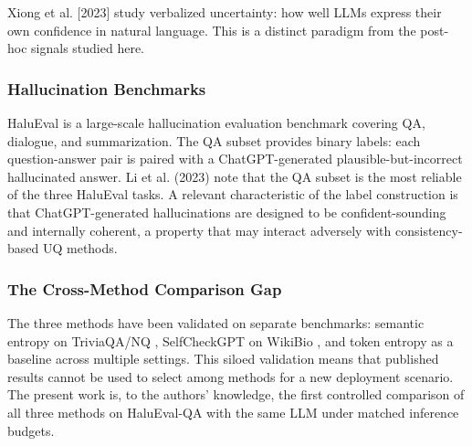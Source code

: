 Xiong et al. [2023] study verbalized uncertainty: how well LLMs express their own confidence in natural language. This is a distinct paradigm from the post-hoc signals studied here.

\subsubsection{Hallucination Benchmarks}

HaluEval \citep{Lietal2023} is a large-scale hallucination evaluation benchmark covering QA, dialogue, and summarization. The QA subset provides binary labels: each question-answer pair is paired with a ChatGPT-generated plausible-but-incorrect hallucinated answer. Li et al. (2023) note that the QA subset is the most reliable of the three HaluEval tasks. A relevant characteristic of the label construction is that ChatGPT-generated hallucinations are designed to be confident-sounding and internally coherent, a property that may interact adversely with consistency-based UQ methods.

\subsubsection{The Cross-Method Comparison Gap}

The three methods have been validated on separate benchmarks: semantic entropy on TriviaQA/NQ \citep{Kuhnetal2023}, SelfCheckGPT on WikiBio \citep{Manakuletal2023}, and token entropy as a baseline across multiple settings. This siloed validation means that published results cannot be used to select among methods for a new deployment scenario. The present work is, to the authors' knowledge, the first controlled comparison of all three methods on HaluEval-QA with the same LLM under matched inference budgets.

